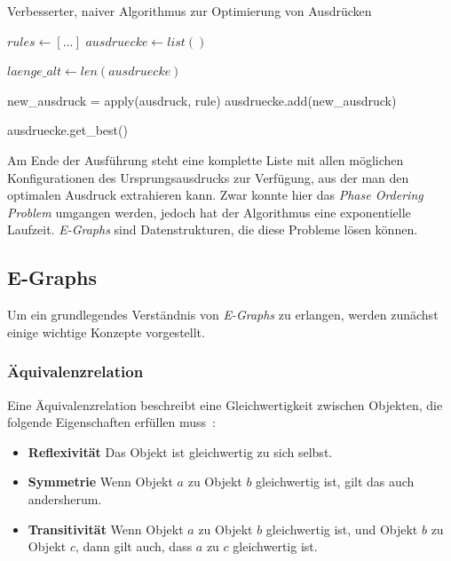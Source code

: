 \begin{algorithm}[H]
  \caption{Verbesserter, naiver Algorithmus zur Optimierung von Ausdrücken}\label{alg:ausdruck2}
  \begin{algorithmic}
    \State $rules \gets [\ldots]$
    \State $ausdruecke \gets list()$
    
      \State $laenge\_alt \gets len(ausdruecke)$

          \State new\_ausdruck = apply(ausdruck, rule)
          \State ausdruecke.add(new\_ausdruck)
          \EndIf
        \EndFor
      \EndFor
    \EndWhile

    \State \Return ausdruecke.get\_best()
    \EndFunction
  \end{algorithmic}
\end{algorithm}

Am Ende der Ausführung steht eine komplette Liste mit allen möglichen Konfigurationen des Ursprungsausdrucks zur Verfügung, aus der man den optimalen Ausdruck extrahieren kann.
Zwar konnte hier das \textit{Phase Ordering Problem} umgangen werden, jedoch hat der Algorithmus eine exponentielle Laufzeit.
\textit{E-Graphs} sind Datenstrukturen, die diese Probleme lösen können.

\subsection{E-Graphs}

Um ein grundlegendes Verständnis von \textit{E-Graphs} zu erlangen, werden zunächst einige wichtige Konzepte vorgestellt.

\subsubsection{Äquivalenzrelation}

Eine Äquivalenzrelation beschreibt eine Gleichwertigkeit zwischen Objekten, die folgende Eigenschaften erfüllen muss~\cite{Ehrig2001}:

\begin{itemize}
  \item \textbf{Reflexivität} Das Objekt ist gleichwertig zu sich selbst.
  \item \textbf{Symmetrie} Wenn Objekt $a$ zu Objekt $b$ gleichwertig ist, gilt das auch andersherum.
  \item \textbf{Transitivität} Wenn Objekt $a$ zu Objekt $b$ gleichwertig ist, und Objekt $b$ zu Objekt $c$, dann gilt auch, dass $a$ zu $c$ gleichwertig ist.
\end{itemize}

